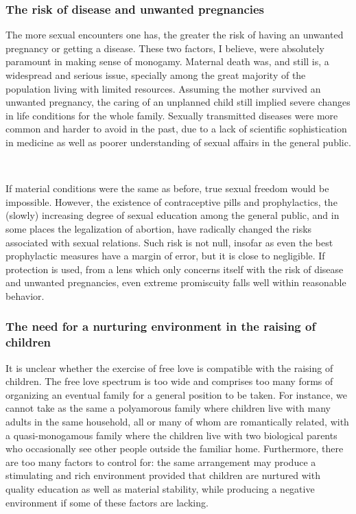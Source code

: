 \documentclass[a4paper, 12pt]{article}
\begin{document}
\subsubsection{The risk of disease and unwanted pregnancies}

The more sexual encounters one has, the greater the risk of having an unwanted
pregnancy or getting a disease. These two factors, I believe, were absolutely
paramount in making sense of monogamy. Maternal death was, and still is, a
widespread and serious issue, specially among the great majority of the
population living with limited resources. Assuming the mother survived an
unwanted pregnancy, the caring of an unplanned child still implied severe
changes in life conditions for the whole family. Sexually transmitted diseases
were more common and harder to avoid in the past, due to a lack of scientific
sophistication in medicine as well as poorer understanding of sexual affairs in
the general public.

~ 

If material conditions were the same as before, true sexual freedom would be
impossible. However, the existence of contraceptive pills and prophylactics,
the (slowly) increasing degree of sexual education among the general public,
and in some places the legalization of abortion, have radically changed the
risks associated with sexual relations. Such risk is not null, insofar as even
the best prophylactic measures have a margin of error, but it is close to
negligible. If protection is used, from a lens which only concerns itself with
the risk of disease and unwanted pregnancies, even extreme promiscuity falls
well within reasonable behavior.

\subsubsection{The need for a nurturing environment in the raising of children}

It is unclear whether the exercise of free love is compatible with the raising
of children. The free love spectrum is too wide and comprises too many forms of
organizing an eventual family for a general position to be taken. For
instance, we cannot take as the same a polyamorous family where children live
with many adults in the same household, all or many of whom are romantically
related, with a quasi-monogamous family where the children live with two
biological parents who occasionally see other people outside the familiar home.
Furthermore, there are too many factors to control for: the same arrangement
may produce a stimulating and rich environment provided that children are
nurtured with quality education as well as material stability, while producing
a negative environment if some of these factors are lacking.
\end{document}
